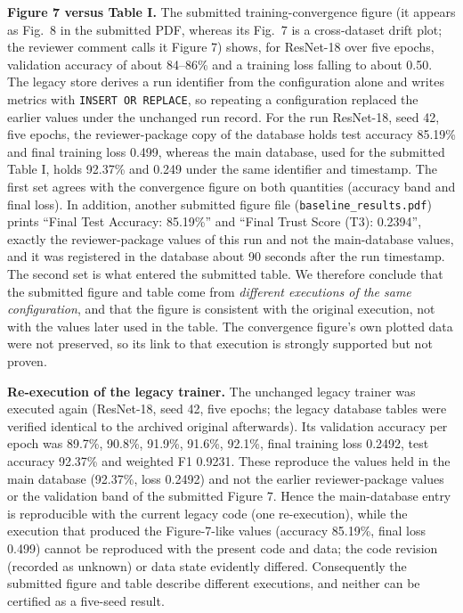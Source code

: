 \documentclass[3p,times,procedia]{elsarticle}
\begin{document}
\textbf{Figure 7 versus Table I.} The submitted training-convergence figure (it appears as Fig.~8 in the submitted PDF, whereas its Fig.~7 is a cross-dataset drift plot; the reviewer comment calls it Figure 7) shows, for ResNet-18 over five epochs, validation accuracy of about 84--86\% and a training loss falling to about 0.50. The legacy store derives a run identifier from the configuration alone and writes metrics with \texttt{INSERT OR REPLACE}, so repeating a configuration replaced the earlier values under the unchanged run record. For the run ResNet-18, seed 42, five epochs, the reviewer-package copy of the database holds test accuracy 85.19\% and final training loss 0.499, whereas the main database, used for the submitted Table I, holds 92.37\% and 0.249 under the same identifier and timestamp. The first set agrees with the convergence figure on both quantities (accuracy band and final loss). In addition, another submitted figure file (\texttt{baseline\_results.pdf}) prints ``Final Test Accuracy: 85.19\%'' and ``Final Trust Score (T3): 0.2394'', exactly the reviewer-package values of this run and not the main-database values, and it was registered in the database about 90 seconds after the run timestamp. The second set is what entered the submitted table. We therefore conclude that the submitted figure and table come from \emph{different executions of the same configuration}, and that the figure is consistent with the original execution, not with the values later used in the table. The convergence figure's own plotted data were not preserved, so its link to that execution is strongly supported but not proven.

\textbf{Re-execution of the legacy trainer.} The unchanged legacy trainer was executed again (ResNet-18, seed 42, five epochs; the legacy database tables were verified identical to the archived original afterwards). Its validation accuracy per epoch was 89.7\%, 90.8\%, 91.9\%, 91.6\%, 92.1\%, final training loss 0.2492, test accuracy 92.37\% and weighted F1 0.9231. These reproduce the values held in the main database (92.37\%, loss 0.2492) and not the earlier reviewer-package values or the validation band of the submitted Figure 7. Hence the main-database entry is reproducible with the current legacy code (one re-execution), while the execution that produced the Figure-7-like values (accuracy 85.19\%, final loss 0.499) cannot be reproduced with the present code and data; the code revision (recorded as unknown) or data state evidently differed. Consequently the submitted figure and table describe different executions, and neither can be certified as a five-seed result.
\end{document}
